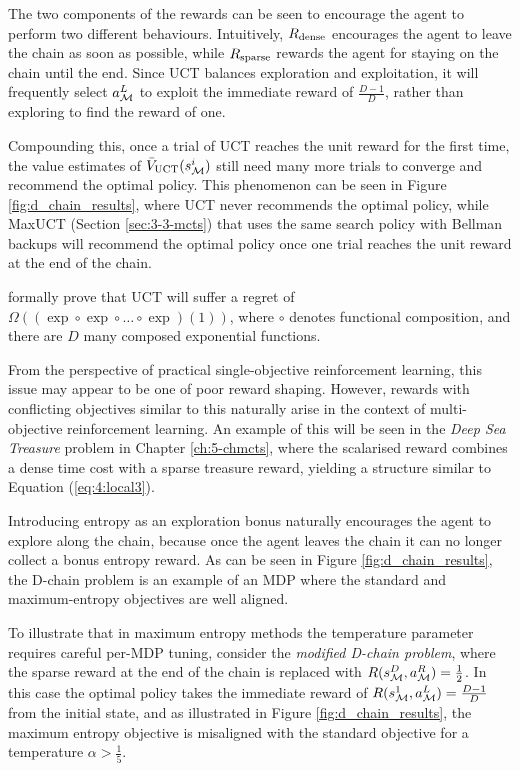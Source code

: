     The two components of the rewards can be seen to encourage the agent to perform two different behaviours. Intuitively, $R_{{\textnormal{dense}}}$ encourages the agent to leave the chain as soon as possible, while $R_{{\textnormal{sparse}}}$ rewards the agent for staying on the chain until the end. Since UCT balances exploration and exploitation, it will frequently select $a^L_{\mathcal{M}}$ to exploit the immediate reward of $\frac{D-1}{D}$, rather than exploring to find the reward of one.

    Compounding this, once a trial of UCT reaches the unit reward for the first time, the value estimates of ${\bar{V}_{{\textnormal{UCT}}}}(s^{i}_{\mathcal{M}})$ still need many more trials to converge and recommend the optimal policy. This phenomenon can be seen in Figure \ref{fig:d_chain_results}, where UCT never recommends the optimal policy, while MaxUCT (Section \ref{sec:3-3-mcts}) that uses the same search policy with Bellman backups will recommend the optimal policy once one trial reaches the unit reward at the end of the chain. 
    
    \citet{dchain} formally prove that UCT will suffer a regret of $\Omega((\exp \circ \exp \circ \ldots \circ \exp)(1))$, where $\circ$ denotes functional composition, and there are $D$ many composed exponential functions. 

    From the perspective of practical single-objective reinforcement learning, this issue may appear to be one of poor reward shaping. However, rewards with conflicting objectives similar to this naturally arise in the context of multi-objective reinforcement learning. An example of this will be seen in the \textit{Deep Sea Treasure} problem in Chapter \ref{ch:5-chmcts}, where the scalarised reward combines a dense time cost with a sparse treasure reward, yielding a structure similar to Equation (\ref{eq:4:local3}).

    Introducing entropy as an exploration bonus naturally encourages the agent to explore along the chain, because once the agent leaves the chain it can no longer collect a bonus entropy reward. As can be seen in Figure \ref{fig:d_chain_results}, the D-chain problem is an example of an MDP where the standard and maximum-entropy objectives are well aligned.

    To illustrate that in maximum entropy methods the temperature parameter requires careful per-MDP tuning, consider the \textit{modified D-chain problem}, where the sparse reward at the end of the chain is replaced with $R(s^{D}_{\mathcal{M}},a^R_{\mathcal{M}})=\frac{1}{2}$. In this case the optimal policy takes the immediate reward of $R(s^{1}_{\mathcal{M}},a^L_{\mathcal{M}})=\frac{D-1}{D}$ from the initial state, and as illustrated in Figure \ref{fig:d_chain_results}, the maximum entropy objective is misaligned with the standard objective for a temperature $\alpha > \frac{1}{5}$.


